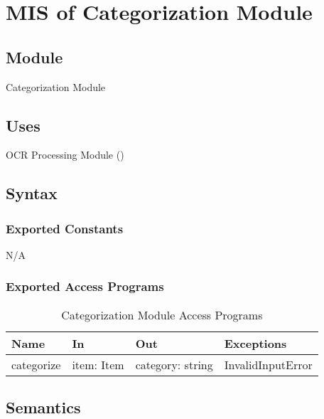 \documentclass[12pt, titlepage]{article}
\begin{document}

\section{MIS of Categorization Module}\label{categorization_module}

\subsection{Module}
Categorization Module

\subsection{Uses}
OCR Processing Module ()\\

\subsection{Syntax}

\subsubsection{Exported Constants}
N/A

\subsubsection{Exported Access Programs}

\begin{center}
  \begin{table}[H]
    \caption{Categorization Module Access Programs}
\begin{tabular}{p{4cm} p{4cm} p{4cm} p{4cm}}
\hline
\textbf{Name} & \textbf{In} & \textbf{Out} & \textbf{Exceptions} \\
\hline
categorize & item: Item & category: string & InvalidInputError \\
\hline
\end{tabular}
\end{table}
\end{center}

\subsection{Semantics}
\end{document}
